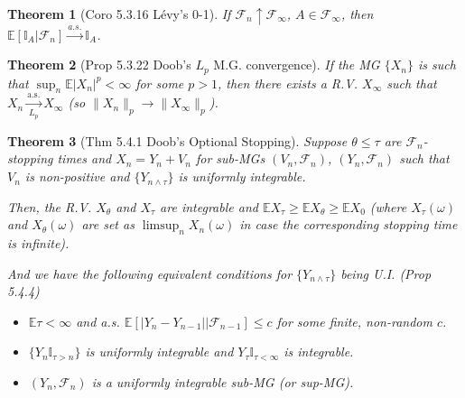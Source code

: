 \documentclass[11pt,a4paper]{article}
\numberwithin{equation}{section}%
\newtheorem{theorem}{Theorem}[]
\begin{document}
\begin{theorem}[Coro 5.3.16 L\'evy's 0-1]
    If $\mathcal{F}_n \uparrow \mathcal{F}_{\infty}$, $A \in \mathcal{F}_{\infty}$, then $\mathbb{E}[\mathbb{I}_A | \mathcal{F}_n] \xrightarrow{a.s.} \mathbb{I}_A$.
\end{theorem}

\begin{theorem}[Prop 5.3.22 Doob's $ L_p $ M.G. convergence]
    If the MG $\{X_n\}$ is such that $\sup_n \mathbb{E}|X_n|^p < \infty$ for some $p > 1$, then there exists a R.V. $X_{\infty}$ such that $X_n\xrightarrow[L_p]{\mathrm{a.s.}}  X_{\infty}$ (so $\|X_n\|_p \to \|X_{\infty}\|_p$).
\end{theorem}

\begin{theorem}[Thm 5.4.1 Doob's Optional Stopping]
    Suppose $\theta \leq \tau$ are $\mathcal{F}_n$-stopping times and $X_n = Y_n + V_n$ for sub-MGs $(V_n, \mathcal{F}_n)$, $(Y_n, \mathcal{F}_n)$ such that $V_n$ is non-positive and $\{Y_{n \wedge \tau}\}$ is uniformly integrable. 
    
    Then, the R.V. $X_{\theta}$ and $X_{\tau}$ are integrable and $\mathbb{E}X_{\tau} \geq \mathbb{E}X_{\theta} \geq \mathbb{E}X_0$ (where $X_{\tau}(\omega)$ and $X_{\theta}(\omega)$ are set as $\limsup_n X_n(\omega)$ in case the corresponding stopping time is infinite).

    And we have the following equivalent conditions for $ \{Y_{n\wedge \tau}\} $ being U.I. (Prop 5.4.4)\
    \begin{itemize}[topsep=0pt,itemsep=-8pt]
        \item $\mathbb{E}\tau < \infty$ and a.s. $\mathbb{E}[|Y_n - Y_{n-1}| | \mathcal{F}_{n-1}] \leq c$ for some finite, non-random $c$.
        \item $\{Y_n \mathbb{I}_{\tau > n}\}$ is uniformly integrable and $Y_{\tau} \mathbb{I}_{\tau < \infty}$ is integrable.
        \item $(Y_n, \mathcal{F}_n)$ is a uniformly integrable sub-MG (or sup-MG).
    \end{itemize}
\end{theorem}
\end{document}
